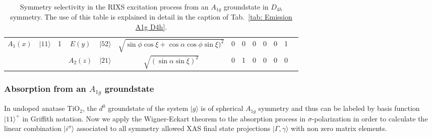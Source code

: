 \documentclass[twocolumn,prb,twocolumn,amsmath,superscriptaddress,nofootinbib,amssymb]{revtex4-1}
\begin{document}
\begin{widetext}
\begin{table*}[htbp]
{\begin{tabular}{cc|c||cc|c||ccccccc}
   $A_1(x)$& $|11\rangle$  & 1     &   $E(y)$ & $|52\rangle$&$\sqrt{\sin\phi\cos\xi+\cos\alpha\cos\phi\sin\xi)^2}$ &        0 &   0&      0 &          0 &          0 &          1 &            \\

      &     &  & $A_2(z)$ &    $|21\rangle$& $\sqrt{(\sin\alpha\sin\xi)^2}$  &   0 &      1&    0 &          0 &          0 &          0&                           \\

\hline
\end{tabular}}
\caption{\label{tab: Absorption A1g D4h} Symmetry selectivity in the RIXS excitation process from an $A_{1g}$ groundstate in $D_{4h}$ symmetry. The use of this table is explained in detail in the caption of Tab.~\ref{tab: Emission A1g D4h}.}
\end{table*}


\subsubsection{Absorption from an $A_{1g}$ groundstate}

In undoped anatase TiO$_2$, the $d^0$ groundstate of the system $|g\rangle$ is of spherical $A_{1g}$ symmetry and thus can be labeled by basis function $|11\rangle^+$ in Griffith notation. Now we apply the Wigner-Eckart theorem to the absorption process in $\sigma$-polarization in order to calculate the linear combination $|i^{\sigma}\rangle$ associated to all symmetry allowed XAS final state projections $|\Gamma,\gamma\rangle$ with non zero matrix elements.



\end{widetext}
\end{document}
